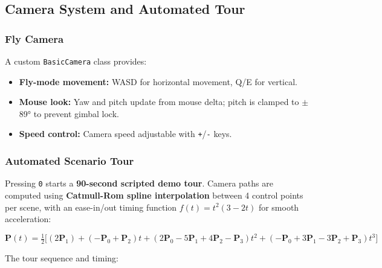 \documentclass[12pt,a4paper]{article}
\begin{document}
\subsection{Camera System and Automated Tour}

\subsubsection*{Fly Camera}
A custom \texttt{BasicCamera} class provides:
\begin{itemize}[noitemsep]
    \item \textbf{Fly-mode movement:} WASD for horizontal movement, Q/E for vertical.
    \item \textbf{Mouse look:} Yaw and pitch update from mouse delta; pitch is clamped to $\pm$89° to prevent gimbal lock.
    \item \textbf{Speed control:} Camera speed adjustable with \texttt{+}/\texttt{-} keys.
\end{itemize}

\subsubsection*{Automated Scenario Tour}
Pressing \texttt{0} starts a \textbf{90-second scripted demo tour}. Camera paths are computed using \textbf{Catmull-Rom spline interpolation} between 4 control points per scene, with an ease-in/out timing function $f(t) = t^2(3-2t)$ for smooth acceleration:

\begin{equation}
    \mathbf{P}(t) = \tfrac{1}{2}\bigl[(2\mathbf{P}_1) + (-\mathbf{P}_0+\mathbf{P}_2)t + (2\mathbf{P}_0-5\mathbf{P}_1+4\mathbf{P}_2-\mathbf{P}_3)t^2 + (-\mathbf{P}_0+3\mathbf{P}_1-3\mathbf{P}_2+\mathbf{P}_3)t^3\bigr]
\end{equation}

The tour sequence and timing:
\end{document}
